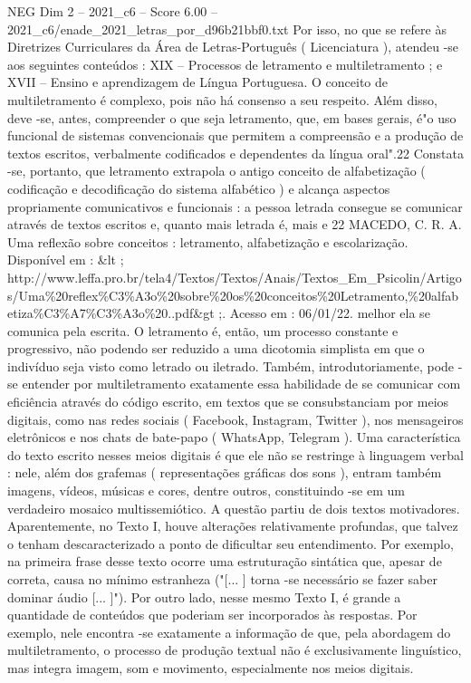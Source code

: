 \begin{textsample}{NEG Dim 2 – 2021\_c6 – Score 6.00 – 2021\_c6/enade\_2021\_letras\_por\_d96b21bbf0.txt}
Por isso, no que se refere às Diretrizes Curriculares da Área de Letras-Português ( Licenciatura ), atendeu -se aos seguintes conteúdos : XIX – Processos de letramento e multiletramento ; e XVII – Ensino e aprendizagem de Língua Portuguesa.
O conceito de multiletramento é complexo, pois não há consenso a seu respeito.
Além disso, deve -se, antes, compreender o que seja letramento, que, em bases gerais, é"o uso funcional de sistemas convencionais que permitem a compreensão e a produção de textos escritos, verbalmente codificados e dependentes da língua oral".22 Constata -se, portanto, que letramento extrapola o antigo conceito de alfabetização ( codificação e decodificação do sistema alfabético ) e alcança aspectos propriamente comunicativos e funcionais : a pessoa letrada consegue se comunicar através de textos escritos e, quanto mais letrada é, mais e 22 MACEDO, C.
R.
A.
Uma reflexão sobre conceitos : letramento, alfabetização e escolarização.
Disponível em : \&lt ; http://www.leffa.pro.br/tela4/Textos/Textos/Anais/Textos\_Em\_Psicolin/Artigos/Uma\%20reflex\%C3\%A3o\%20sobre\%20os\%20conceitos\%20Letramento,\%20alfabetiza\%C3\%A7\%C3\%A3o\%20..pdf\&gt ;.
Acesso em : 06/01/22. melhor ela se comunica pela escrita.
O letramento é, então, um processo constante e progressivo, não podendo ser reduzido a uma dicotomia simplista em que o indivíduo seja visto como letrado ou iletrado.
Também, introdutoriamente, pode -se entender por multiletramento exatamente essa habilidade de se comunicar com eficiência através do código escrito, em textos que se consubstanciam por meios digitais, como nas redes sociais ( Facebook, Instagram, Twitter ), nos mensageiros eletrônicos e nos chats de bate-papo ( WhatsApp, Telegram ).
Uma característica do texto escrito nesses meios digitais é que ele não se restringe à linguagem verbal : nele, além dos grafemas ( representações gráficas dos sons ), entram também imagens, vídeos, músicas e cores, dentre outros, constituindo -se em um verdadeiro mosaico multissemiótico.
A questão partiu de dois textos motivadores.
Aparentemente, no Texto I, houve alterações relativamente profundas, que talvez o tenham descaracterizado a ponto de dificultar seu entendimento.
Por exemplo, na primeira frase desse texto ocorre uma estruturação sintática que, apesar de correta, causa no mínimo estranheza ("[... ] torna -se necessário se fazer saber dominar áudio [... ]").
Por outro lado, nesse mesmo Texto I, é grande a quantidade de conteúdos que poderiam ser incorporados às respostas.
Por exemplo, nele encontra -se exatamente a informação de que, pela abordagem do multiletramento, o processo de produção textual não é exclusivamente linguístico, mas integra imagem, som e movimento, especialmente nos meios digitais.

\end{textsample}
